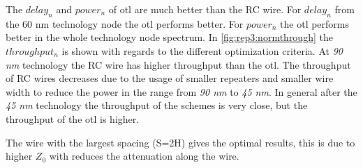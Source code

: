 The $delay_{n}$ and $power_{n}$ of  \ac{otl} are much better than the RC wire. For $delay_{n}$ from the 60 nm technology node the \ac{otl} performs better.
For $power_{n}$ the \ac{otl} performs better in the whole technology node spectrum.
In \cref{fig:rep3:normthrough} the $throughput_{n}$ is shown with regards to the different optimization criteria.
At \textit{90 nm} technology the RC wire has higher throughput than the \ac{otl}.
The throughput of RC wires decreases due to the usage of smaller repeaters and smaller wire width to reduce the power in the range from \textit{90 nm} to \textit{45 nm}.
In general after the \textit{45 nm} technology the throughput of the schemes is very close, but the throughput of the \ac{otl} is higher.

The wire with the largest spacing (S=2H) gives the optimal results, this is due to higher $Z_{0}$ with reduces the attenuation along the wire.
